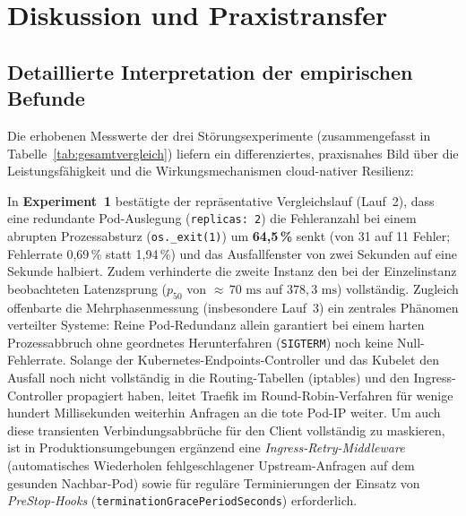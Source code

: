\chapter{Diskussion und Praxistransfer}
\label{chap:diskussion-praxistransfer}

\section{Detaillierte Interpretation der empirischen Befunde}
\label{sec:bewertung-ergebnisse}
Die erhobenen Messwerte der drei Störungsexperimente (zusammengefasst in Tabelle~\ref{tab:gesamtvergleich}) liefern ein differenziertes, praxisnahes Bild über die Leistungsfähigkeit und die Wirkungsmechanismen cloud-nativer Resilienz:

In \textbf{Experiment~1} bestätigte der repräsentative Vergleichslauf (Lauf~2), dass eine redundante Pod-Auslegung (\texttt{replicas: 2}) die Fehleranzahl bei einem abrupten Prozessabsturz (\texttt{os.\_exit(1)}) um \textbf{64,5\,\%} senkt (von 31 auf 11 Fehler; Fehlerrate 0{,}69\,\% statt 1{,}94\,\%) und das Ausfallfenster von zwei Sekunden auf eine Sekunde halbiert. Zudem verhinderte die zweite Instanz den bei der Einzelinstanz beobachteten Latenzsprung ($p_{50}$ von $\approx\,70\text{ ms}$ auf $378{,}3\text{ ms}$) vollständig. Zugleich offenbarte die Mehrphasenmessung (insbesondere Lauf~3) ein zentrales Phänomen verteilter Systeme: Reine Pod-Redundanz allein garantiert bei einem harten Prozessabbruch ohne geordnetes Herunterfahren (\texttt{SIGTERM}) noch keine Null-Fehlerrate. Solange der Kubernetes-Endpoints-Controller und das Kubelet den Ausfall noch nicht vollständig in die Routing-Tabellen (iptables) und den Ingress-Controller propagiert haben, leitet Traefik im Round-Robin-Verfahren für wenige hundert Millisekunden weiterhin Anfragen an die tote Pod-IP weiter. Um auch diese transienten Verbindungsabbrüche für den Client vollständig zu maskieren, ist in Produktionsumgebungen ergänzend eine \textit{Ingress-Retry-Middleware} (automatisches Wiederholen fehlgeschlagener Upstream-Anfragen auf dem gesunden Nachbar-Pod) sowie für reguläre Terminierungen der Einsatz von \textit{PreStop-Hooks} (\texttt{terminationGracePeriodSeconds}) erforderlich.

